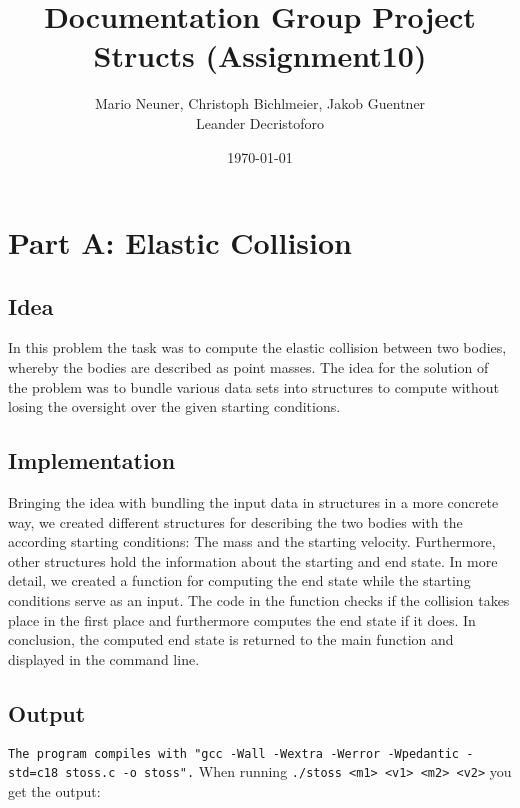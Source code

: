 \documentclass[12pt,a4paper]{article}
\title{\textbf{Documentation Group Project Structs (Assignment10)}}
\author{Mario Neuner, Christoph Bichlmeier, Jakob Guentner\\Leander Decristoforo}
\date{\today}
\begin{document}
\maketitle
\vspace{5cm}
\tableofcontents
\pagebreak


\section{Part A: Elastic Collision}
\vspace{1cm}
\subsection{Idea}
In this problem the task was to compute the elastic collision between two bodies, whereby the bodies are 
described as point masses. The idea for the solution of the problem was to bundle various data sets into 
structures to compute without losing the oversight over the given starting conditions.
\newline

\vspace{1cm}

\subsection{Implementation}
Bringing the idea with bundling the input data in structures in a more concrete way, we created different 
structures for describing the two bodies with the according starting conditions: The mass and the starting 
velocity. Furthermore, other structures hold the information about the starting and end state. In more 
detail, we created a function for computing the end state while the starting conditions serve as an input. 
The code in the function checks if the collision takes place in the first place and furthermore computes the 
end state if it does. In conclusion, the computed end state is returned to the main function and displayed 
in the command line.
\newline

\vspace{1cm}

\subsection{Output}
\texttt{The program compiles with "gcc -Wall -Wextra -Werror -Wpedantic -std=c18 stoss.c -o stoss".}
When running \texttt{./stoss <m1> <v1> <m2> <v2>} you get the output: 
\end{document}
